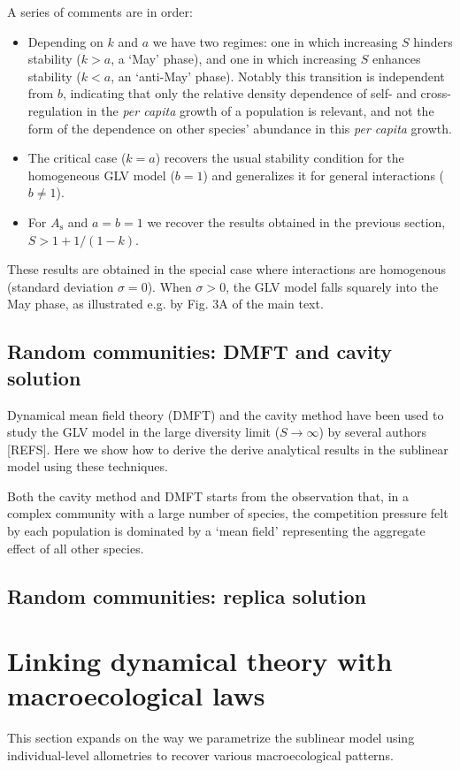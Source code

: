 \documentclass[12pt]{article}
\begin{document}
A series of comments are in order:
\begin{itemize}
    \item Depending on $k$ and $a$ we have two regimes: one in which increasing $S$ hinders stability ($k > a$, a `May' phase), and one in which increasing $S$ enhances stability ($k < a$, an `anti-May' phase). Notably this transition is independent from $b$, indicating that only the relative density dependence of self- and cross-regulation in the \emph{per capita} growth of a population is relevant, and not the form of the dependence on other species' abundance in this \emph{per capita} growth. 
    \item The critical case ($k=a$) recovers the usual stability condition for the homogeneous GLV model ($b=1$) and generalizes it for general interactions ($b\neq 1$).
    \item For $ A_{\textrm{s}}$ and $a = b = 1$ we recover the results obtained in the previous section, $S > 1 + 1/(1-k)$. 
\end{itemize}

These results are obtained in the special case where interactions are homogenous (standard deviation $\sigma = 0$). When $\sigma > 0$, the GLV model falls squarely into the May phase, as illustrated e.g. by Fig. 3A of the main text. 

\subsection{Random communities: DMFT and cavity solution}

Dynamical mean field theory (DMFT) and the cavity method have been used to study the GLV model in the large diversity limit ($S\to\infty$) by several authors [REFS]. Here we show how to derive the derive analytical results in the sublinear model using these techniques.

Both the cavity method and DMFT starts from the observation that, in a complex community with a large number of species, the competition pressure felt by each population is dominated by a `mean field' representing the aggregate effect of all other species. 


\subsection{Random communities: replica solution}

\section{Linking dynamical theory with macroecological laws}
This section expands on the way we parametrize the sublinear model using individual-level allometries to recover various macroecological patterns. 
\end{document}
